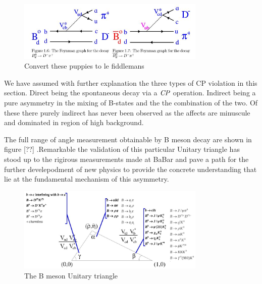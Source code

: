 \begin{figure}[h]
\centering
\includegraphics[width=0.8\textwidth]{figs/gam.JPG}
\caption{Convert these puppies to le fiddlemans}
\label{pBGD}
\end{figure}


We have assumed with further explanation the three types of CP violation in this section. Direct being the spontaneous decay via a $\it{CP}$ operation. Indirect being a pure asymmetry in the mixing of B-states and the the combination of the two. Of these there purely indirect has never been observed as the affects are minuscule and dominated in region of high background.


The full range of angle measurement obtainable by B meson decay are shown in figure [??] .Remarkable the validation of this particular Unitary triangle has stood up to the rigirous measurements made at BaBar and pave a path for the further develepodment of new physics to provide the concrete understanding that lie at the fundamental mechanism of this asymmetry.
 \begin{figure}[h]
\centering
\includegraphics[width=0.8\textwidth]{figs/trig.JPG}
\caption{The B meson Unitary triangle}
\label{BBD}
\end{figure}



%
